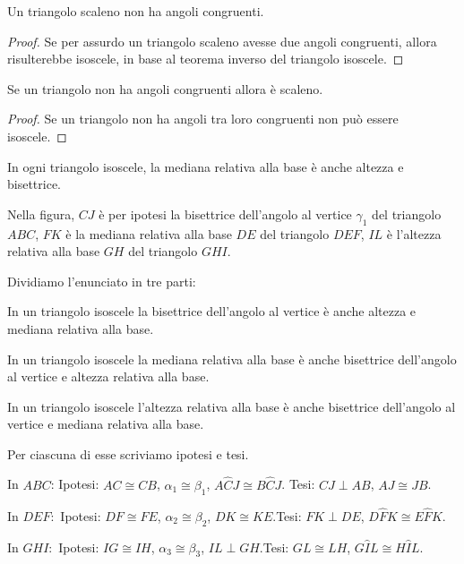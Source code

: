 \begin{corollario}
Un triangolo scaleno non ha angoli congruenti.
\end{corollario}

\begin{proof}
Se per assurdo un triangolo scaleno avesse due angoli congruenti, 
allora risulterebbe isoscele, in base al teorema inverso del 
triangolo isoscele.
\end{proof}

\begin{corollario}
Se un triangolo non ha angoli congruenti allora è scaleno.
\end{corollario}

\begin{proof}
Se un triangolo non ha angoli tra loro congruenti non può essere 
isoscele.
\end{proof}

\begin{proposizione}
In ogni triangolo isoscele, la mediana relativa alla base è anche 
altezza e bisettrice.
\end{proposizione}
Nella figura, \(CJ\) è per ipotesi la bisettrice dell'angolo al vertice 
\(\gamma_1\) del triangolo \(ABC\), \(FK\) è la mediana relativa alla base 
\(DE\) del triangolo \(DEF\), \(IL\) è l'altezza relativa alla base \(GH\) 
del triangolo \(GHI\).


\begin{inaccessibleblock}
 \begin{figure}[htb]
\centering
\end{figure}
\end{inaccessibleblock}

Dividiamo l'enunciato in tre parti:
\begin{enumeratea}
\item In un triangolo isoscele la bisettrice dell'angolo al vertice è 
anche altezza e mediana relativa alla base.
\item In un triangolo isoscele la mediana relativa alla base è anche 
bisettrice dell'angolo al vertice e altezza relativa alla base.
\item In un triangolo isoscele l'altezza relativa alla base è anche 
bisettrice dell'angolo al vertice e mediana relativa alla base.
\end{enumeratea}

Per ciascuna di esse scriviamo ipotesi e tesi.
\begin{enumeratea}
\item In \(ABC\):	Ipotesi: \(AC\cong CB\), \(\alpha_1\cong \beta_1\), 
\(A\widehat{C}J\cong B\widehat{C}J\). Tesi: \(CJ\perp AB\), \(AJ\cong JB\).
\item In \(DEF\):	\,Ipotesi: \(DF\cong FE\), \(\alpha_2\cong \beta_2\), 
\(DK\cong KE\).\tab Tesi: \(FK\perp DE\), \(D\widehat{F}K\cong 
E\widehat{F}K\).
\item In \(GHI\):	\,Ipotesi: \(IG\cong IH\), \(\alpha_3\cong \beta_3\), 
\(IL\perp GH\).\tab Tesi: \(GL\cong LH\), \(G\widehat{I}L\cong 
H\widehat{I}L\).
\end{enumeratea}

